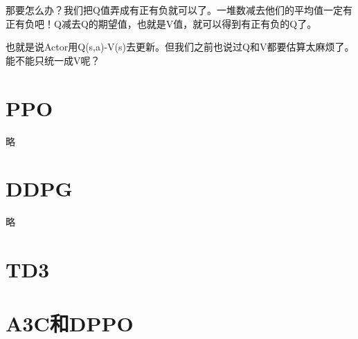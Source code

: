 \documentclass[12pt]{article}
\begin{document}
那要怎么办？我们把Q值弄成有正有负就可以了。一堆数减去他们的平均值一定有正有负吧！Q减去Q的期望值，也就是V值，就可以得到有正有负的Q了。

也就是说Actor用Q(s,a)-V(s)去更新。但我们之前也说过Q和V都要估算太麻烦了。能不能只统一成V呢？

\section{PPO}
略

\section{DDPG}
略


\section{TD3}


\section{A3C和DPPO}
























\end{document}
